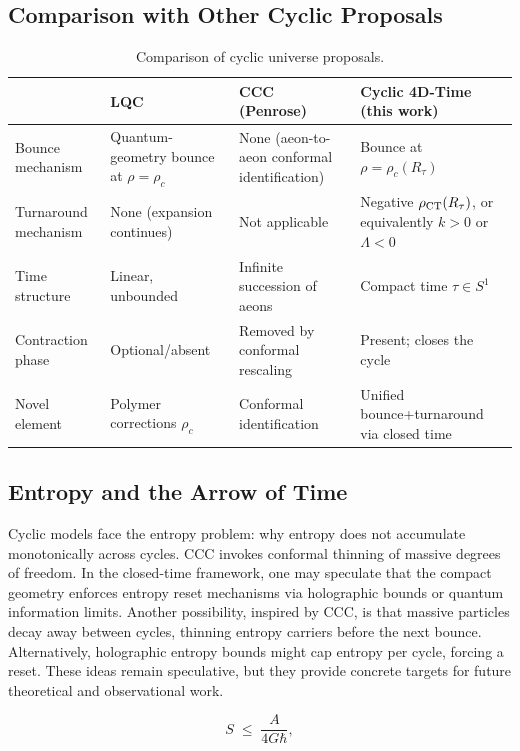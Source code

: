 \documentclass[12pt]{article}
\begin{document}
\subsection*{Comparison with Other Cyclic Proposals}
\begin{table}[H]
\centering
\footnotesize
\setlength{\tabcolsep}{4pt}
\renewcommand{\arraystretch}{1.25}
\begin{tabularx}{\linewidth}{lYYY}
\toprule
 & \textbf{LQC} & \textbf{CCC (Penrose)} & \textbf{Cyclic 4D-Time (this work)} \\
\midrule
Bounce mechanism
& Quantum-geometry bounce at $\rho=\rho_c$
& None (aeon-to-aeon conformal identification)
& Bounce at $\rho=\rho_c(R_\tau)$ \\
Turnaround mechanism
& None (expansion continues)
& Not applicable
& Negative $\rho_{\rm CT}(R_\tau)$, or equivalently $k>0$ or $\Lambda<0$ \\
Time structure
& Linear, unbounded
& Infinite succession of aeons
& Compact time $\tau\in S^1$ \\
Contraction phase
& Optional/absent
& Removed by conformal rescaling
& Present; closes the cycle \\
Novel element
& Polymer corrections $\rho_c$
& Conformal identification
& Unified bounce+turnaround via closed time \\
\bottomrule
\end{tabularx}
\caption{Comparison of cyclic universe proposals.}
\end{table}

\subsection*{Entropy and the Arrow of Time}
Cyclic models face the entropy problem: why entropy does not accumulate monotonically across
cycles. CCC invokes conformal thinning of massive degrees of freedom. In the closed-time
framework, one may speculate that the compact geometry enforces entropy reset mechanisms
via holographic bounds or quantum information limits. Another possibility, inspired by CCC,
is that massive particles decay away between cycles, thinning entropy carriers before the
next bounce. Alternatively, holographic entropy bounds might cap entropy per cycle,
forcing a reset. These ideas remain speculative, but they provide concrete targets for
future theoretical and observational work. 

\begin{equation}
S \;\leq\; \frac{A}{4G\hbar},
\end{equation}
\end{document}

